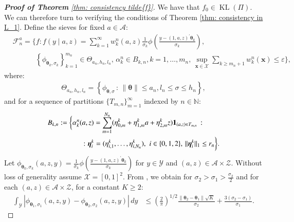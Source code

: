 \begin{proof}[\hypertarget{proof of thm consistency f tilde}{\textbf{Proof of Theorem}} \ref{thm: consistency tilde{f}}]
    We have that $f_0 \in \operatorname{KL}(\Pi)$. We can therefore turn to verifying the conditions of Theorem \ref{thm: consistency in L_1}. Define the sieves for fixed $a \in \mathcal{A}$:
    $$
    \begin{aligned} & \mathcal{F}^a_n=\bigg\{f: f(y \mid a,z)=\sum_{k=1}^{\infty} w^n_k(a,z) \frac{1}{\sigma_k} \phi\left(\frac{y-(1,a,z)^{\prime} \boldsymbol{\theta}_k}{\sigma_k}\right), \\ &  \quad \quad \quad \, \left\{\phi_{\boldsymbol{\theta}_k, \sigma_k}\right\}_{k=1}^{m_n} \in \Theta_{a_n, h_n, l_n}, \, \alpha^n_k \in B_{k, n}, k=1, \ldots, m_n, \, \sup _{\boldsymbol{x} \in \mathcal{X}} \sum_{k \geq m_n+1} w^n_k(\boldsymbol{x}) \leq \varepsilon\bigg\},
    \end{aligned}
    $$
    where:
    \begin{align}
        \Theta_{a_n, h_n, l_n}=\left\{\phi_{\boldsymbol{\theta}, \sigma} \, : \, \|\boldsymbol{\theta}\| \leq a_n, l_n \leq \sigma \leq h_n \right\},
    \end{align}
    and for a sequence of partitions $\{T_{m,n} \}_{m=1}^{\infty}$ indexed by $n \in \mathbb{N}$:
    \begin{align}
        B_{k,n} &:= \bigg\{ \alpha_k^n(a,z) = \sum_{m=1}^{N_n} (\eta_{0,m}^k + \eta_{1,m}^k a + \eta_{2,m}^k z) \mathbf{1}_{(a,z) \in T_{m,n}} \, :\\
        &\quad \quad \quad \, : \boldsymbol{\eta}_i^k = (\eta_{i,1}^k, \ldots, \eta_{i,N_n}^k), \, \, i \in \{0,1,2 \}, \, \| \boldsymbol{\eta}_i^k \|_1 \leq r_n \bigg\}.
    \end{align}
    Let $\phi_{\boldsymbol{\theta}_k, \sigma_k}(a,z,y) = \frac{1}{\sigma_k} \phi\left(\frac{y-(1,a,z)^{\prime} \boldsymbol{\theta}_k}{\sigma_k}\right)$ for $y \in \mathcal{Y}$ and $(a,z) \in \mathcal{A} \times \mathcal{Z}$. Without loss of generality assume $\mathcal{X}=[0,1]^2$. From \cite{200}, we obtain for $\sigma_2>\sigma_1>\frac{\sigma_2}{2}$ and for each $(a,z) \in \mathcal{A} \times \mathcal{Z}$, for a constant $K \geq 2$:
    $$
    \begin{aligned}
    \int_{\mathcal{Y}}\left|\phi_{\boldsymbol{\theta}_1, \sigma_1}(a,z,y) -\phi_{\boldsymbol{\theta}_2, \sigma_2}(a,z,y) \right| \, d y & \leq\left(\frac{2}{\pi}\right)^{1 / 2} \frac{\left\|\boldsymbol{\theta}_2-\boldsymbol{\theta}_1\right\| \sqrt{K}}{\sigma_2}+\frac{3\left(\sigma_2-\sigma_1\right)}{\sigma_1}.

\end{aligned}$$
\end{proof}
